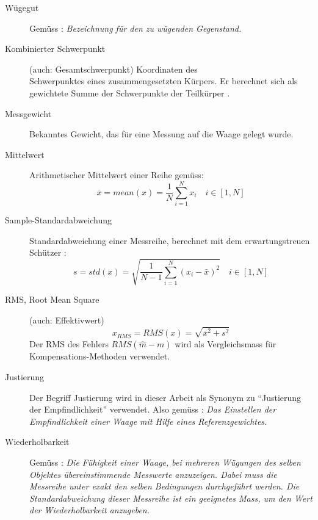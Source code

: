 \begin{description}
     \item[Wügegut] 
       Gemüss \cite{waegelexikon}: \emph{Bezeichnung für den zu wügenden Gegenstand.}
       
     \item[Kombinierter Schwerpunkt] 
       (auch: Gesamt\-schwer\-punkt) Koordi\-naten des\\ Schwerpunktes eines zusammen\-gesetzten Kürpers. Er berechnet sich als gewichtete Summe der Schwerpunkte der Teilkürper \cite{kuchling}.
              
     \item[Messgewicht]
       Bekanntes Gewicht, das für eine Messung auf die Waage gelegt wurde. 
                     
     \item[Mittelwert]
       Arithmetischer Mittelwert einer Reihe gemüss:
     \begin{equation*}
		 \overline{x} = mean(x) = \frac{1}{N} \sum_{i=1}^N x_i \quad i\in[1,N]
		 \end{equation*}
		 
		 \item[Sample-Standardabweichung]
		   Standard\-abweichung einer Messreihe, berechnet mit dem erwartungs\-treuen Schützer      \cite{mueller}:
		 \begin{equation*}
		 s = std(x) = \sqrt{\frac{1}{N-1} \sum_{i=1}^N (x_i-\bar{x})^2}\quad i\in[1,N]
		 \end{equation*}
		 
		 \item[RMS, Root Mean Square]
		   (auch: Effektivwert)
		 \begin{equation*}
		 x_{RMS} = RMS(x) = \sqrt{\overline{x}^2 + s^2}
		 \end{equation*}
		 Der RMS des Fehlers $RMS(\widehat m - m)$ wird als Vergleichsmass für Kom\-pen\-sations-Methoden verwendet.
		 
		 \item[Justierung]
		  Der Begriff Justierung wird in dieser Arbeit als Synonym zu "`Justierung der Empfindlichkeit"' verwendet. Also gemüss \cite{waegelexikon}: \emph{Das Einstellen der Empfindlichkeit einer Waage mit Hilfe eines Referenzgewichtes.}
		 
		 \item[Wiederholbarkeit]
		 Gemüss \cite{waegelexikon}: \emph{Die Fühigkeit einer Waage, bei mehreren Wügungen des selben Objektes übereinstimmende Messwerte anzuzeigen. Dabei muss die Messreihe unter exakt den selben Bedingungen durchgeführt werden. Die Standardabweichung dieser Messreihe ist ein geeignetes Mass, um den Wert der Wiederholbarkeit anzugeben.}
		 

\end{description}
